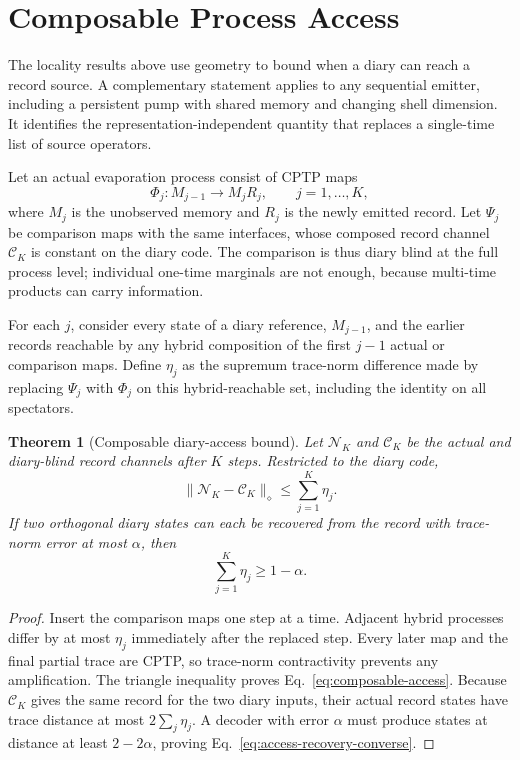 \documentclass[11pt]{article}
\newtheorem{theorem}{Theorem}
\newcommand{\cN}{\mathcal N}
\newcommand{\cC}{\mathcal C}
\begin{document}
\section{Composable Process Access}

The locality results above use geometry to bound when a diary can reach a
record source.  A complementary statement applies to any sequential emitter,
including a persistent pump with shared memory and changing shell dimension.
It identifies the representation-independent quantity that replaces a
single-time list of source operators.

Let an actual evaporation process consist of CPTP maps
\begin{equation}
  \Phi_j:M_{j-1}\longrightarrow M_jR_j,
  \qquad j=1,\ldots,K,
\end{equation}
where $M_j$ is the unobserved memory and $R_j$ is the newly emitted record.
Let $\Psi_j$ be comparison maps with the same interfaces, whose composed
record channel $\cC_K$ is constant on the diary code.  The comparison is thus
diary blind at the full process level; individual one-time marginals are not
enough, because multi-time products can carry information.

For each $j$, consider every state of a diary reference, $M_{j-1}$, and the
earlier records reachable by any hybrid composition of the first $j-1$ actual
or comparison maps.  Define $\eta_j$ as the supremum trace-norm difference
made by replacing $\Psi_j$ with $\Phi_j$ on this hybrid-reachable set,
including the identity on all spectators.

\begin{theorem}[Composable diary-access bound]
\label{thm:composable-access}
Let $\cN_K$ and $\cC_K$ be the actual and diary-blind record channels after
$K$ steps.  Restricted to the diary code,
\begin{equation}
  \lVert\cN_K-\cC_K\rVert_\diamond
  \le \sum_{j=1}^K \eta_j .
  \label{eq:composable-access}
\end{equation}
If two orthogonal diary states can each be recovered from the record with
trace-norm error at most $\alpha$, then
\begin{equation}
  \sum_{j=1}^K\eta_j\ge 1-\alpha.
  \label{eq:access-recovery-converse}
\end{equation}
\end{theorem}

\begin{proof}
Insert the comparison maps one step at a time.  Adjacent hybrid processes differ
by at most $\eta_j$ immediately after the replaced step.  Every later map and
the final partial trace are CPTP, so trace-norm contractivity prevents any
amplification.  The triangle inequality proves
Eq.~\eqref{eq:composable-access}.  Because $\cC_K$ gives the same record for
the two diary inputs, their actual record states have trace distance at most
$2\sum_j\eta_j$.  A decoder with error $\alpha$ must produce states at
distance at least $2-2\alpha$, proving
Eq.~\eqref{eq:access-recovery-converse}.
\end{proof}
\end{document}
